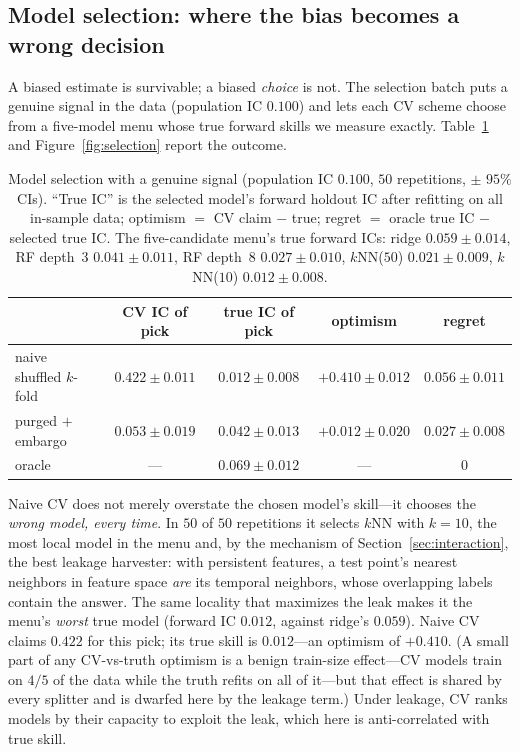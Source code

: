 \documentclass[11pt]{article}
\begin{document}
\subsection{Model selection: where the bias becomes a wrong decision}
\label{sec:selection}

A biased estimate is survivable; a biased \emph{choice} is not. The
selection batch puts a genuine signal in the data (population IC $0.100$)
and lets each CV scheme choose from a five-model menu whose true forward
skills we measure exactly. Table~\ref{tab:selection} and
Figure~\ref{fig:selection} report the outcome.

\begin{table}[t]
\centering
\caption{Model selection with a genuine signal (population IC $0.100$, $50$
repetitions, $\pm$ $95\%$ CIs). ``True IC'' is the selected model's forward
holdout IC after refitting on all in-sample data; optimism $=$ CV claim $-$
true; regret $=$ oracle true IC $-$ selected true IC. The five-candidate
menu's true forward ICs: ridge $0.059 \pm 0.014$, RF depth~3
$0.041 \pm 0.011$, RF depth~8 $0.027 \pm 0.010$, $k$NN($50$)
$0.021 \pm 0.009$, $k$NN($10$) $0.012 \pm 0.008$.}
\label{tab:selection}
\small
\begin{tabular}{lcccc}
\toprule
 & CV IC of pick & true IC of pick & optimism & regret \\
\midrule
naive shuffled $k$-fold & $0.422 \pm 0.011$ & $0.012 \pm 0.008$ & $+0.410 \pm 0.012$ & $0.056 \pm 0.011$ \\
purged $+$ embargo      & $0.053 \pm 0.019$ & $0.042 \pm 0.013$ & $+0.012 \pm 0.020$ & $0.027 \pm 0.008$ \\
oracle                  & ---               & $0.069 \pm 0.012$ & ---                & $0$ \\
\bottomrule
\end{tabular}
\end{table}

Naive CV does not merely overstate the chosen model's skill---it chooses the
\emph{wrong model, every time}. In $50$ of $50$ repetitions it selects
$k$NN with $k=10$, the most local model in the menu and, by the mechanism of
Section~\ref{sec:interaction}, the best leakage harvester: with persistent
features, a test point's nearest neighbors in feature space \emph{are} its
temporal neighbors, whose overlapping labels contain the answer. The same
locality that maximizes the leak makes it the menu's \emph{worst} true model
(forward IC $0.012$, against ridge's $0.059$). Naive CV claims $0.422$ for
this pick; its true skill is $0.012$---an optimism of $+0.410$. (A small
part of any CV-vs-truth optimism is a benign train-size effect---CV models
train on $4/5$ of the data while the truth refits on all of it---but that
effect is shared by every splitter and is dwarfed here by the leakage term.)
Under
leakage, CV ranks models by their capacity to exploit the leak, which here
is anti-correlated with true skill.
\end{document}
